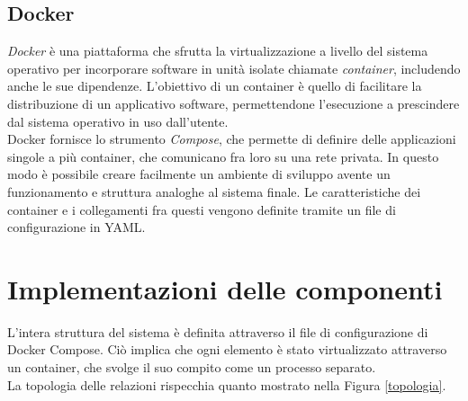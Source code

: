 \subsection{Docker}
\textit{Docker} è una piattaforma che sfrutta la virtualizzazione a livello del sistema operativo per incorporare software 
in unità isolate chiamate \textit{container}, includendo anche le sue dipendenze. L'obiettivo di un container è quello di 
facilitare la distribuzione di un applicativo software, permettendone l'esecuzione a prescindere dal sistema operativo 
in uso dall'utente. 
\\ Docker fornisce lo strumento \textit{Compose}, che permette di definire delle applicazioni singole a più container, 
che comunicano fra loro su una rete privata. In questo modo è possibile creare facilmente un ambiente di sviluppo avente 
un funzionamento e struttura analoghe al sistema finale. Le caratteristiche dei container e i collegamenti fra questi vengono definite tramite un file di configurazione in YAML. 


\section{Implementazioni delle componenti}
L'intera struttura del sistema è definita attraverso il file di configurazione di Docker Compose. Ciò implica che ogni 
elemento è stato virtualizzato attraverso un container, che svolge il suo compito come un processo separato. 
\\ La topologia delle relazioni rispecchia quanto mostrato nella Figura \ref*{topologia}. 


